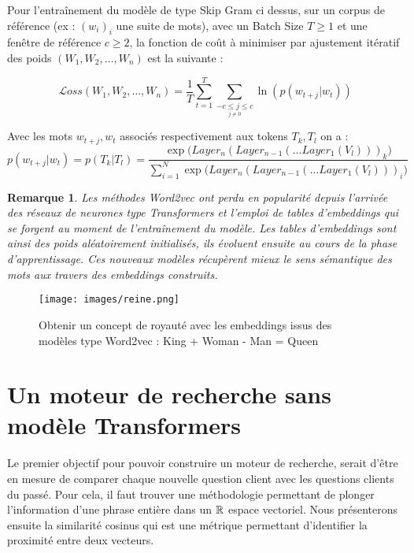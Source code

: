 \documentclass[12pt]{article}
\newtheorem{rmq}{Remarque}
\theoremstyle{definition}
\begin{document}
	Pour l'entraînement du modèle de type Skip Gram ci dessus, sur un corpus  de référence (ex : $(w_i)_i$ une suite de mots), avec un Batch Size  $T \geq 1$ et une fenêtre de référence $c\geq2$, la fonction de coût à minimiser par ajustement itératif des poids $(W_1,W_2,\dots,W_n)$ est la suivante :  
	
	$$\displaystyle\mathcal{L}oss(W_1,W_2,\dots,W_n) = \dfrac{1}{T}\sum_{t=1}^{T}\sum_{\underset{j\neq 0}{-c\leq j \leq c}} \ln(p(w_{t+j}|w_t))$$
	
	\noindent Avec les mots $w_{t+j}, w_{t}$ associés respectivement aux tokens $T_k, T_l$ on a :
	 $$ p(w_{t+j}|w_t) = p(T_k|T_l) = \dfrac{\displaystyle\exp\big(Layer_n(Layer_{n-1}(\dots Layer_1(V_l)))_k\big)}{\displaystyle\sum_{i=1}^{N}\exp\big(Layer_n(Layer_{n-1}(\dots Layer_1(V_l)))_i\big)}$$
	
	
	\begin{rmq}
		Les méthodes Word2vec ont perdu en popularité depuis l'arrivée des réseaux de neurones type Transformers et l'emploi de tables d'embeddings qui se forgent au moment de l'entraînement du modèle. Les tables d'embeddings sont ainsi des poids aléatoirement initialisés, ils évoluent ensuite au cours de la phase d'apprentissage. Ces nouveaux modèles récupèrent mieux le sens sémantique des mots aux travers des embeddings construits. 
	\end{rmq}

		\begin{figure*}[!h]
		\centering
		\texttt{[image: images/reine.png]}
		\caption{Obtenir un concept de royauté avec les embeddings issus des modèles type Word2vec : King + Woman - Man = Queen \cite{Distributed_Representations_of_Words} }
	\end{figure*}
	
	
	\section{Un moteur de recherche sans modèle Transformers}
	
	Le premier objectif pour pouvoir construire un moteur de recherche, serait d'être en mesure de comparer chaque nouvelle question client avec les questions clients du passé. Pour cela, il faut trouver une méthodologie permettant de plonger l'information d'une phrase entière dans un $\mathbb{R}$ espace vectoriel. Nous présenterons ensuite la similarité cosinus qui est une métrique permettant d'identifier la proximité entre deux vecteurs.
	
	
	
\end{document}
